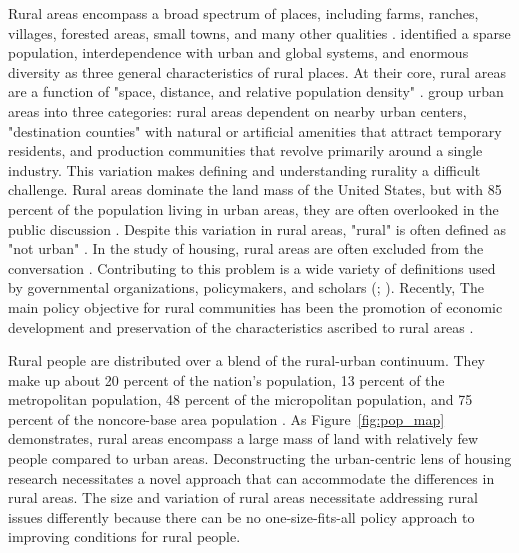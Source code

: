  Rural areas encompass a broad spectrum of places, including farms, ranches, villages, forested areas, small towns, and many other qualities \citep{cromartie_defining_2008}. \citet{castle_conceptual_1998} identified a sparse population, interdependence with urban and global systems, and enormous diversity as three general characteristics of rural places.  At their core, rural areas are a function of "space, distance, and relative population density" \citep[?]{castle_place_2011}. \citet{shoup_principles_2010} group urban areas into three categories: rural areas dependent on nearby urban centers, "destination counties" with natural or artificial amenities that attract temporary residents, and production communities that revolve primarily around a single industry. This variation makes defining and understanding rurality a difficult challenge. Rural areas dominate the land mass of the United States, but with 85 percent of the population living in urban areas, they are often overlooked in the public discussion \citep{pendall_future_2016}. Despite this variation in rural areas,  "rural" is often defined as "not urban" \citep{noauthor_rural_2009}. In the study of housing, rural areas are often excluded from the conversation \citep{gkartzios_housing_2017}. Contributing to this problem is a wide variety of definitions used by governmental organizations, policymakers, and scholars (\citealp{yousey_defining_2018}; \citealp{cromartie_defining_2008}). Recently, The main policy objective for rural communities has been the promotion of economic development and preservation of the characteristics ascribed to rural areas \citep{lichter_changing_2007}. 

Rural people are distributed over a blend of the rural-urban continuum. They make up about 20 percent of the nation's population, 13 percent of the metropolitan population, 48 percent of the micropolitan population, and 75 percent of the noncore-base area population \citep{isserman_national_2005}. As Figure~\ref{fig:pop_map} demonstrates, rural areas encompass a large mass of land with relatively few people compared to urban areas. Deconstructing the urban-centric lens of housing research necessitates a novel approach that can accommodate the differences in rural areas. The size and variation of rural areas necessitate addressing rural issues differently because there can be no one-size-fits-all policy approach to improving conditions for rural people. 


